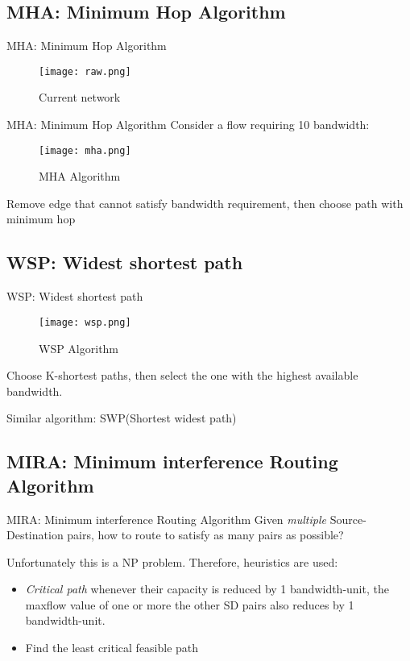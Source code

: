 \documentclass{beamer}
\begin{document}
\subsection{MHA: Minimum Hop Algorithm}
\begin{frame}{MHA: Minimum Hop Algorithm}

\begin{figure}
    \texttt{[image: raw.png]}
    \caption{Current network}
\end{figure}
    
\end{frame}

\begin{frame}{MHA: Minimum Hop Algorithm}
    Consider a flow requiring 10 bandwidth:
    \begin{figure}
    \texttt{[image: mha.png]}
    \caption{MHA Algorithm}
\end{figure}
Remove edge that cannot satisfy bandwidth requirement, then choose path with minimum hop
\end{frame}

\subsection{WSP: Widest shortest path}
\begin{frame}{WSP: Widest shortest path}
    \begin{figure}
    \texttt{[image: wsp.png]}
    \caption{WSP Algorithm}
    \end{figure}
    Choose K-shortest paths, then select the one with the highest available bandwidth.
    
    Similar algorithm: SWP(Shortest widest path)
\end{frame}

\subsection{MIRA: Minimum interference Routing Algorithm}
\begin{frame}{MIRA: Minimum interference Routing Algorithm}
    Given \emph{multiple} Source-Destination pairs, how to route to satisfy as many pairs as possible?

Unfortunately this is a NP problem. Therefore, heuristics are used:

\begin{itemize}
    \item \emph{Critical path}
     whenever their capacity is reduced by 1 bandwidth-unit, the maxflow value of one or more the other SD pairs also reduces by 1 bandwidth-unit.
    \item Find the least critical feasible path
\end{itemize}

\end{frame}
\end{document}
